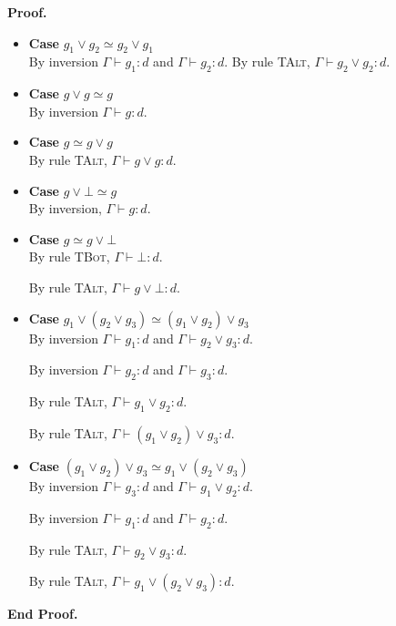 \documentclass{article}
\newcommand{\judgebalance}[3][\Gamma]{{#1} \vdash {#2} : {#3}}
\newenvironment{proof}{\noindent\textbf{Proof.}}{\noindent\textbf{End Proof.}}
\newenvironment{caseblock}{\begin{itemize}}{\end{itemize}}
\newenvironment{case}[1]{\item \textbf{Case} {#1}\\}{}
\begin{document}
\begin{proof}
  \begin{caseblock}
    \begin{case}{$g_1 \vee g_2 \simeq g_2 \vee g_1$}
      By inversion $\judgebalance{g_1}{d}$ and $\judgebalance{g_2}{d}$. By 
      rule \textsc{TAlt}, $\judgebalance{g_2 \vee g_2}{d}$. 
    \end{case}

    \begin{case}{$g \vee g \simeq g$}
      By inversion $\judgebalance{g}{d}$. 
    \end{case}

    \begin{case}{$g \simeq g \vee g$}
      By rule \textsc{TAlt}, $\judgebalance{g \vee g}{d}$. 
    \end{case}

    \begin{case}{$g \vee \bot \simeq g$}
      By inversion, $\judgebalance{g}{d}$. 
    \end{case}

    \begin{case}{$g \simeq g \vee \bot$}
      By rule \textsc{TBot}, $\judgebalance{\bot}{d}$. 

      By rule \textsc{TAlt}, $\judgebalance{g \vee \bot}{d}$. 
    \end{case}

    \begin{case}{$g_1 \vee (g_2 \vee g_3) \simeq (g_1 \vee g_2) \vee g_3$}
      By inversion $\judgebalance{g_1}{d}$ and $\judgebalance{g_2 \vee g_3}{d}$. 

      By inversion $\judgebalance{g_2}{d}$ and $\judgebalance{g_3}{d}$.

      By rule \textsc{TAlt}, $\judgebalance{g_1 \vee g_2}{d}$.
      
      By rule \textsc{TAlt}, $\judgebalance{(g_1 \vee g_2) \vee g_3}{d}$. 
    \end{case}

    \begin{case}{$(g_1 \vee g_2) \vee g_3 \simeq g_1 \vee (g_2 \vee g_3)$}
      By inversion $\judgebalance{g_3}{d}$ and $\judgebalance{g_1 \vee g_2}{d}$. 

      By inversion $\judgebalance{g_1}{d}$ and $\judgebalance{g_2}{d}$.

      By rule \textsc{TAlt}, $\judgebalance{g_2 \vee g_3}{d}$.
      
      By rule \textsc{TAlt}, $\judgebalance{g_1 \vee (g_2 \vee g_3)}{d}$. 
    \end{case}


\end{caseblock}
\end{proof}
\end{document}
